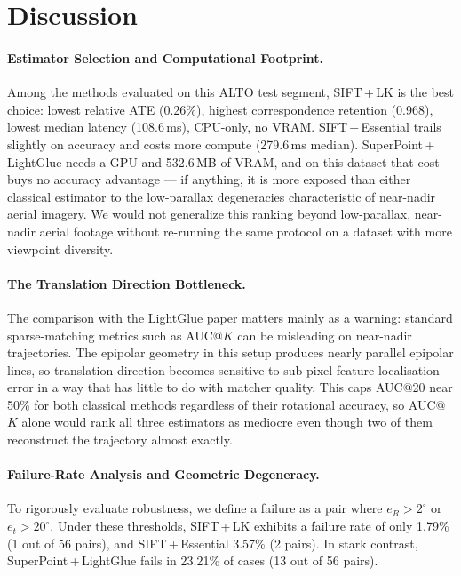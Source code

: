 \documentclass[11pt,a4paper]{article}
\begin{document}
\section{Discussion}

\paragraph{Estimator Selection and Computational Footprint.}
Among the methods evaluated on this ALTO test segment, SIFT\,+\,LK is
the best choice: lowest relative ATE (0.26\%), highest correspondence
retention (0.968), lowest median latency (108.6\,ms), CPU-only, no
VRAM. SIFT\,+\,Essential trails slightly on accuracy and costs more
compute (279.6\,ms median). SuperPoint\,+\,LightGlue needs a GPU and
532.6\,MB of VRAM, and on this dataset that cost buys no accuracy
advantage --- if anything, it is more exposed than either classical
estimator to the low-parallax degeneracies characteristic of
near-nadir aerial imagery. We would not generalize this ranking beyond
low-parallax, near-nadir aerial footage without re-running the same
protocol on a dataset with more viewpoint diversity.

\paragraph{The Translation Direction Bottleneck.}
The comparison with the LightGlue paper matters mainly as a warning:
standard sparse-matching metrics such as AUC@$K$ can be misleading on
near-nadir trajectories. The epipolar geometry in this setup produces
nearly parallel epipolar lines, so translation direction becomes
sensitive to sub-pixel feature-localisation error in a way that has
little to do with matcher quality. This caps AUC@20 near 50\% for both
classical methods regardless of their rotational accuracy, so AUC@$K$
alone would rank all three estimators as mediocre even though two of
them reconstruct the trajectory almost exactly.

\paragraph{Failure-Rate Analysis and Geometric Degeneracy.}
To rigorously evaluate robustness, we define a failure as a pair where $e_R > 2^\circ$ or $e_t > 20^\circ$. 
Under these thresholds, SIFT\,+\,LK exhibits a failure rate of only 1.79\% (1 out of 56 pairs), 
and SIFT\,+\,Essential 3.57\% (2 pairs). In stark contrast, SuperPoint\,+\,LightGlue fails in 23.21\% 
of cases (13 out of 56 pairs). 
\end{document}
